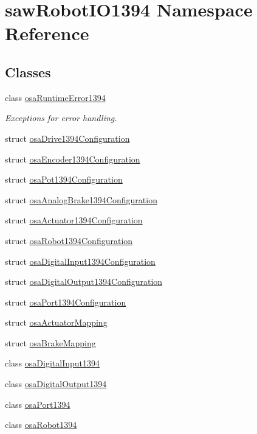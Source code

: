\hypertarget{namespacesaw_robot_i_o1394}{\section{saw\-Robot\-I\-O1394 Namespace Reference}
\label{namespacesaw_robot_i_o1394}
}
\subsection*{Classes}
\begin{DoxyCompactItemize}
\item 
class \hyperlink{classsaw_robot_i_o1394_1_1osa_runtime_error1394}{osa\-Runtime\-Error1394}
\begin{DoxyCompactList}\small\item\em Exceptions for error handling. \end{DoxyCompactList}\item 
struct \hyperlink{structsaw_robot_i_o1394_1_1osa_drive1394_configuration}{osa\-Drive1394\-Configuration}
\item 
struct \hyperlink{structsaw_robot_i_o1394_1_1osa_encoder1394_configuration}{osa\-Encoder1394\-Configuration}
\item 
struct \hyperlink{structsaw_robot_i_o1394_1_1osa_pot1394_configuration}{osa\-Pot1394\-Configuration}
\item 
struct \hyperlink{structsaw_robot_i_o1394_1_1osa_analog_brake1394_configuration}{osa\-Analog\-Brake1394\-Configuration}
\item 
struct \hyperlink{structsaw_robot_i_o1394_1_1osa_actuator1394_configuration}{osa\-Actuator1394\-Configuration}
\item 
struct \hyperlink{structsaw_robot_i_o1394_1_1osa_robot1394_configuration}{osa\-Robot1394\-Configuration}
\item 
struct \hyperlink{structsaw_robot_i_o1394_1_1osa_digital_input1394_configuration}{osa\-Digital\-Input1394\-Configuration}
\item 
struct \hyperlink{structsaw_robot_i_o1394_1_1osa_digital_output1394_configuration}{osa\-Digital\-Output1394\-Configuration}
\item 
struct \hyperlink{structsaw_robot_i_o1394_1_1osa_port1394_configuration}{osa\-Port1394\-Configuration}
\item 
struct \hyperlink{structsaw_robot_i_o1394_1_1osa_actuator_mapping}{osa\-Actuator\-Mapping}
\item 
struct \hyperlink{structsaw_robot_i_o1394_1_1osa_brake_mapping}{osa\-Brake\-Mapping}
\item 
class \hyperlink{classsaw_robot_i_o1394_1_1osa_digital_input1394}{osa\-Digital\-Input1394}
\item 
class \hyperlink{classsaw_robot_i_o1394_1_1osa_digital_output1394}{osa\-Digital\-Output1394}
\item 
class \hyperlink{classsaw_robot_i_o1394_1_1osa_port1394}{osa\-Port1394}
\item 
class \hyperlink{classsaw_robot_i_o1394_1_1osa_robot1394}{osa\-Robot1394}
\end{DoxyCompactItemize}
